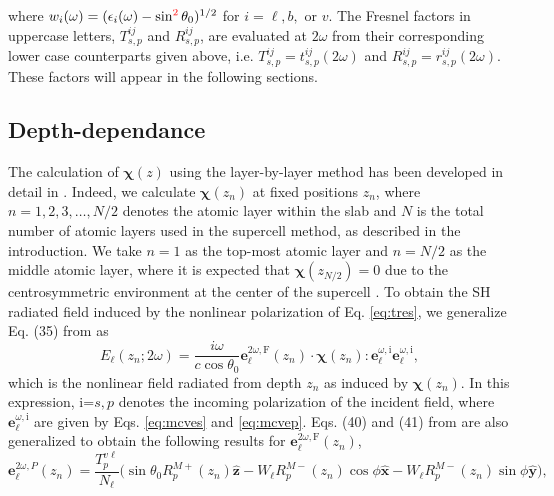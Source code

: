 \documentclass[utf8]{frontiersSCNS}
\begin{document}
where $w_{i}(\omega)=(\epsilon_{i}(\omega) -
\sin^{\color{red}2}\theta_{0})^{1/2}$ for $i = \ell,b,$ or $v$.
The Fresnel factors in uppercase letters, $T^{ij}_{s,p}$ and $R^{ij}_{s,p}$, are
evaluated at $2\omega$ from their corresponding lower case counterparts given
above, i.e. $T^{ij}_{s,p} = t^{ij}_{s,p}(2\omega)$ and $R^{ij}_{s,p} =
r^{ij}_{s,p}(2\omega)$. These factors will appear in the following sections.


\subsection{Depth-dependance}

The calculation of $\boldsymbol{\chi}(z)$ using the layer-by-layer method has
been developed in detail in \cite{andersonPRB15}. Indeed, we calculate
$\boldsymbol{\chi}(z_{n})$ at fixed positions $z_{n}$, where $n =
1,2,3,\ldots,N/2$ denotes the atomic layer within the slab and $N$ is the total
number of atomic layers used in the supercell method, as described in the
introduction. We take $n = 1$ as the top-most atomic layer and $n = N/2$ as the
middle atomic layer, where it is expected that $\boldsymbol{\chi}(z_{N/2}) = 0$
due to the centrosymmetric environment at the center of the supercell
\citep{andersonPRB15}. To obtain the SH radiated field induced by the nonlinear
polarization of Eq. \eqref{eq:tres}, we generalize Eq. (35) from
\cite{andersonPRB16b} as
\begin{equation}\label{eq:mr10n}
E_{\ell}(z_{n};2\omega) = 
\frac{i \omega}{c\cos\theta_{0}}
\mathbf{e}^{2\omega,\mathrm{F}}_{\ell}(z_{n})\cdot 
\boldsymbol{\chi}(z_{n}): 
\mathbf{e}^{\omega,\mathrm{i}}_{\ell}
\mathbf{e}^{\omega,\mathrm{i}}_{\ell},
\end{equation}
which is the nonlinear field radiated from depth $z_{n}$ as induced by
$\boldsymbol{\chi}(z_{n})$. In this expression, i=$s,p$ denotes the incoming
polarization of the incident field, where
$\mathbf{e}^{\omega,\mathrm{i}}_{\ell}$ are given by Eqs. \eqref{eq:mcves}  and
\eqref{eq:mcvep}. Eqs. (40) and (41) from \cite{andersonPRB16b} are also
generalized to obtain the following results for
$\mathbf{e}^{2\omega,\mathrm{F}}_{\ell}(z_{n})$,
\begin{equation}\label{eq:e2wpmrn}
\mathbf{e}^{2\omega,P}_{\ell}(z_{n}) =
\frac{T^{v\ell}_{p}}{N_{\ell}}
\big(
  \sin\theta_{0}R^{M+}_{p}(z_{n})\mathbf{\hat{z}} 
- W_{\ell}R^{M-}_{p}(z_{n})\cos\phi\mathbf{\hat{x}}
- W_{\ell}R^{M-}_{p}(z_{n})\sin\phi\mathbf{\hat{y}}
\big),
\end{equation}
\end{document}
